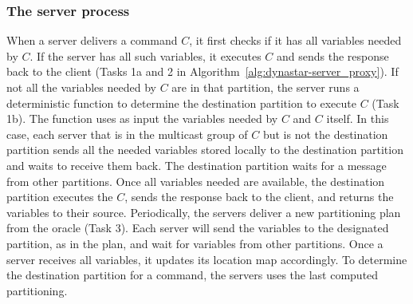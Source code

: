 \subsubsection{The server process}


When a server delivers a command $C$, it first checks if it has all variables
needed by $C$. If the server has all such variables, it executes $C$ and sends
the response back to the client (Tasks 1a and 2 in
Algorithm~\ref{alg:dynastar-server_proxy}). If not all the variables needed by $C$ are in
that partition, the server runs a deterministic function to determine the
destination partition to execute $C$ (Task 1b). The function uses as input the
variables needed by $C$ and $C$ itself. In this case, each server that is in the
multicast group of $C$ but is not the destination partition sends all the needed
variables stored locally to the destination partition and waits to receive them
back. The destination partition waits for a message from other partitions. Once
all variables needed are available, the destination partition executes the $C$,
sends the response back to the client, and returns the variables to their
source. Periodically, the servers deliver a new partitioning plan from the
oracle (Task 3). Each server will send the variables to the designated
partition, as in the plan, and wait for variables from other partitions. Once a
server receives all variables, it updates its location map accordingly.
To determine the destination partition for a command, the servers uses the last
computed partitioning.



